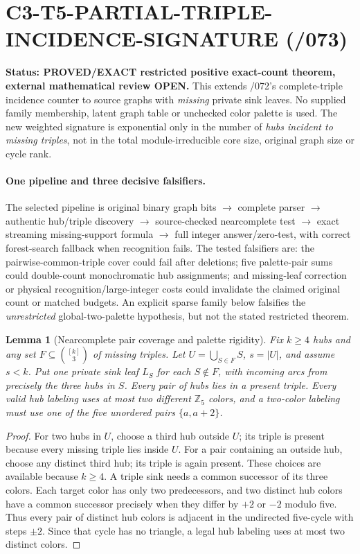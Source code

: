 \documentclass[11pt]{article}
\newtheorem{lemma}{Lemma}
\begin{document}
\clearpage
\section{C3-T5-PARTIAL-TRIPLE-INCIDENCE-SIGNATURE (/073)}

\noindent\textbf{Status: PROVED/EXACT restricted positive exact-count
theorem, external mathematical review OPEN.}
This extends /072's complete-triple incidence counter to source graphs
with \emph{missing} private sink leaves. No supplied family membership,
latent graph table or unchecked color palette is used.
The new weighted signature is exponential only in the number of
\emph{hubs incident to missing triples}, not in the total
module-irreducible core size, original graph size or cycle rank.

\paragraph{One pipeline and three decisive falsifiers.}
The selected pipeline is original binary graph bits $\to$ complete
parser $\to$ authentic hub/triple discovery $\to$ source-checked
nearcomplete test $\to$ exact streaming missing-support
formula $\to$ full integer answer/zero-test, with correct
forest-search fallback when recognition fails.
The tested falsifiers are: the pairwise-common-triple
cover could fail after deletions; five palette-pair sums
could double-count monochromatic hub assignments; and
missing-leaf correction or physical recognition/large-integer costs
could invalidate the claimed original count or matched budgets.
An explicit sparse family below falsifies the \emph{unrestricted}
global-two-palette hypothesis, but not the stated restricted theorem.

\begin{lemma}[Nearcomplete pair coverage and palette rigidity]
Fix $k\ge4$ hubs and any set $F\subseteq\binom{[k]}3$
of missing triples. Let
$U=\bigcup_{S\in F}S$, $s=|U|$, and assume $s<k$.
Put one private sink leaf $L_S$ for each $S\notin F$,
with incoming arcs from precisely the three hubs in $S$.
Every pair of hubs lies in a \emph{present} triple.
Every valid hub labeling uses at most two different
$\mathbb Z_5$ colors, and a two-color labeling
must use one of the five unordered pairs $\{a,a+2\}$.
\end{lemma}
\begin{proof}
For two hubs in $U$, choose a third hub outside $U$;
its triple is present because every missing triple lies inside $U$.
For a pair containing an outside hub, choose any distinct third
hub; its triple is again present. These choices are available
because $k\ge4$.
A triple sink needs a common successor of its three colors.
Each target color has only two predecessors, and two
distinct hub colors have a common successor precisely when
they differ by $+2$ or $-2$ modulo five.
Thus every pair of distinct hub colors is adjacent in the
undirected five-cycle with steps $\pm2$.
Since that cycle has no triangle, a legal hub labeling uses
at most two distinct colors.
\end{proof}
\end{document}
